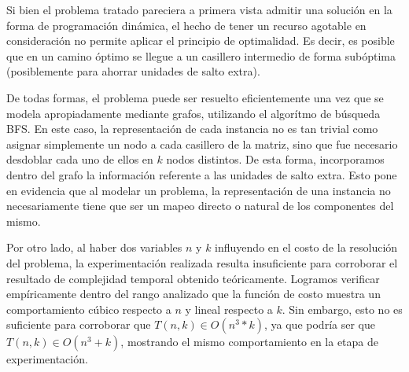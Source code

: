 Si bien el problema tratado pareciera a primera vista admitir una solución en la forma de programación dinámica, el hecho de tener un recurso agotable en consideración no permite aplicar el principio de optimalidad. Es decir, es posible que en un camino óptimo se llegue a un casillero intermedio de forma subóptima (posiblemente para ahorrar unidades de salto extra).

De todas formas, el problema puede ser resuelto eficientemente una vez que se modela apropiadamente mediante grafos, utilizando el algorítmo de búsqueda BFS. En este caso, la representación de cada instancia no es tan trivial como asignar simplemente un nodo a cada casillero de la matriz, sino que fue necesario desdoblar cada uno de ellos en $k$ nodos distintos. De esta forma, incorporamos dentro del grafo la información referente a las unidades de salto extra. Esto pone en evidencia que al modelar un problema, la representación de una instancia no necesariamente tiene que ser un mapeo directo o natural de los componentes del mismo.

Por otro lado, al haber dos variables $n$ y $k$ influyendo en el costo de la resolución del problema, la experimentación realizada resulta insuficiente para corroborar el resultado de complejidad temporal obtenido teóricamente. Logramos verificar empíricamente dentro del rango analizado que la función de costo muestra un comportamiento cúbico respecto a $n$ y lineal respecto a $k$. Sin embargo, esto no es suficiente para corroborar que $T(n,k) \in O(n^3 * k)$, ya que podría ser que $T(n,k) \in O(n^3 + k)$, mostrando el mismo comportamiento en la etapa de experimentación.
